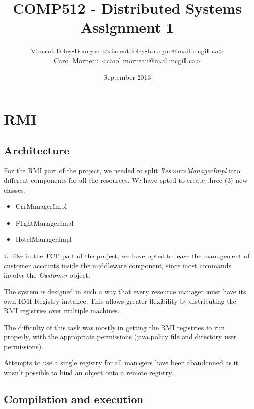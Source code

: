 \documentclass[11pt]{article}
\begin{document}
\title{COMP512 - Distributed Systems \\ Assignment 1}
\author{
  Vincent Foley-Bourgon <vincent.foley-bourgon@mail.mcgill.ca> \\
  Carol Morneau <carol.morneau@mail.mcgill.ca>
}
\date{September 2013}

\maketitle




\section{RMI}

\subsection{Architecture}

For the RMI part of the project, we needed to split {\it
  ResourceManagerImpl} into different components for all the
resources.  We have opted to create three (3) new classes:


\begin{itemize}
  \item CarManagerImpl
  \item FlightManagerImpl
  \item HotelManagerImpl
\end{itemize}

Unlike in the TCP part of the project, we have opted to leave the
management of customer accounts inside the middleware component, since
most commands involve the {\it Customer} object.

The system is designed in such a way that every resource manager must
have its own RMI Registry instance.  This allows greater flexibility
by distributing the RMI registries over multiple machines.

The difficulty of this task was mostly in getting the RMI registries
to run properly, with the appropriate permissions (java.policy file
and directory user permissions).

Attempts to use a single registry for all managers have been
abandonned as it wasn't possible to bind an object onto a remote
registry.


\subsection{Compilation and execution}
\end{document}
